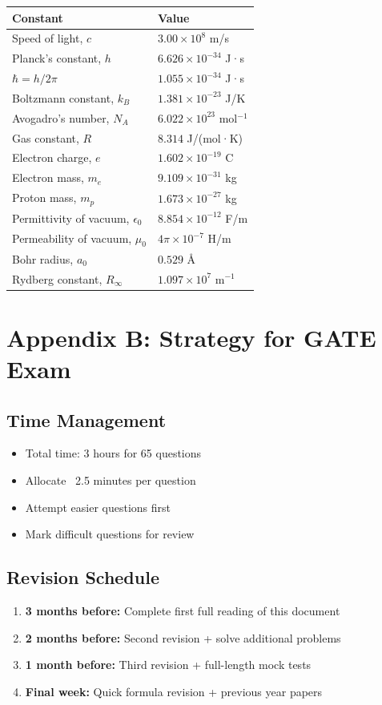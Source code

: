 \documentclass[12pt,a4paper]{article}
\begin{document}
\begin{tabular}{ll}
\hline
\textbf{Constant} & \textbf{Value} \\
\hline
Speed of light, $c$ & $3.00 \times 10^8$ m/s \\
Planck's constant, $h$ & $6.626 \times 10^{-34}$ J·s \\
$\hbar = h/2\pi$ & $1.055 \times 10^{-34}$ J·s \\
Boltzmann constant, $k_B$ & $1.381 \times 10^{-23}$ J/K \\
Avogadro's number, $N_A$ & $6.022 \times 10^{23}$ mol$^{-1}$ \\
Gas constant, $R$ & $8.314$ J/(mol·K) \\
Electron charge, $e$ & $1.602 \times 10^{-19}$ C \\
Electron mass, $m_e$ & $9.109 \times 10^{-31}$ kg \\
Proton mass, $m_p$ & $1.673 \times 10^{-27}$ kg \\
Permittivity of vacuum, $\epsilon_0$ & $8.854 \times 10^{-12}$ F/m \\
Permeability of vacuum, $\mu_0$ & $4\pi \times 10^{-7}$ H/m \\
Bohr radius, $a_0$ & $0.529$ Å \\
Rydberg constant, $R_\infty$ & $1.097 \times 10^7$ m$^{-1}$ \\
\hline
\end{tabular}

\newpage

\section*{Appendix B: Strategy for GATE Exam}

\subsection*{Time Management}
\begin{itemize}
    \item Total time: 3 hours for 65 questions
    \item Allocate ~2.5 minutes per question
    \item Attempt easier questions first
    \item Mark difficult questions for review
\end{itemize}

\subsection*{Revision Schedule}
\begin{enumerate}
    \item \textbf{3 months before:} Complete first full reading of this document
    \item \textbf{2 months before:} Second revision + solve additional problems
    \item \textbf{1 month before:} Third revision + full-length mock tests
    \item \textbf{Final week:} Quick formula revision + previous year papers
\end{enumerate}
\end{document}
